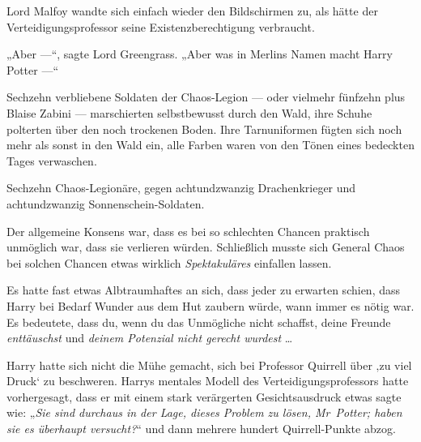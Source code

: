 Lord Malfoy wandte sich einfach wieder den Bildschirmen zu, als hätte der Verteidigungsprofessor seine Existenzberechtigung verbraucht.

„Aber —“, sagte Lord Greengrass.
„Aber was in Merlins Namen macht Harry Potter —“

\later

Sechzehn verbliebene Soldaten der Chaos-Legion — oder vielmehr fünfzehn plus Blaise Zabini — marschierten selbstbewusst durch den Wald, ihre Schuhe polterten über den noch trockenen Boden. Ihre Tarnuniformen fügten sich noch mehr als sonst in den Wald ein, alle Farben waren von den Tönen eines bedeckten Tages verwaschen.

Sechzehn Chaos-Legionäre, gegen achtundzwanzig Drachenkrieger und achtundzwanzig Sonnenschein-Soldaten.

Der allgemeine Konsens war, dass es bei so schlechten Chancen praktisch unmöglich war, dass sie verlieren würden. Schließlich musste sich General Chaos bei solchen Chancen etwas wirklich \emph{Spektakuläres} einfallen lassen.

Es hatte fast etwas Albtraumhaftes an sich, dass jeder zu erwarten schien, dass Harry bei Bedarf Wunder aus dem Hut zaubern würde, wann immer es nötig war. Es bedeutete, dass du, wenn du das Unmögliche nicht schaffst, deine Freunde \emph{enttäuschst} und \emph{deinem Potenzial nicht gerecht wurdest} …

Harry hatte sich nicht die Mühe gemacht, sich bei Professor Quirrell über ‚zu viel Druck‘ zu beschweren. Harrys mentales Modell des Verteidigungsprofessors hatte vorhergesagt, dass er mit einem stark verärgerten Gesichtsausdruck etwas sagte wie:
„\emph{Sie sind durchaus in der Lage, dieses Problem zu lösen, Mr~Potter; haben sie es überhaupt versucht?}“ und dann mehrere hundert Quirrell-Punkte abzog.

